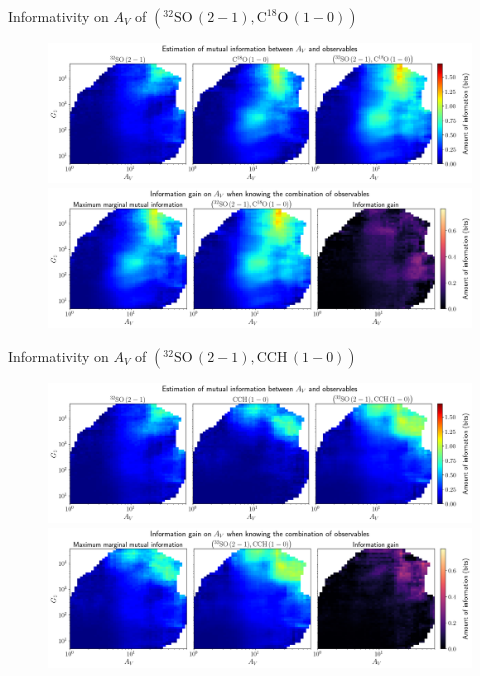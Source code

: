 \documentclass{beamer}
\begin{document}
\begin{frame}{Informativity on $A_V$ of $\left(\mathrm{^{32}SO\,(2-1)},\mathrm{C^{18}O\,(1-0)}\right)$}
    \begin{figure}
        \centering
        \includegraphics[width=0.95\linewidth]{../mi/av__32so21_c18o10_mi.png}
        \vfill
        \includegraphics[width=0.95\linewidth]{../mi/av__32so21_c18o10_mi_gain.png}
    \end{figure}
\end{frame}

\begin{frame}{Informativity on $A_V$ of $\left(\mathrm{^{32}SO\,(2-1)},\mathrm{CCH\,(1-0)}\right)$}
    \begin{figure}
        \centering
        \includegraphics[width=0.95\linewidth]{../mi/av__32so21_cch10_mi.png}
        \vfill
        \includegraphics[width=0.95\linewidth]{../mi/av__32so21_cch10_mi_gain.png}
    \end{figure}
\end{frame}
\end{document}
